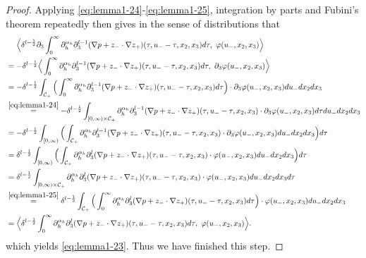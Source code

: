 \documentclass[10pt,reqno]{amsart}
\numberwithin{equation}{section}
\begin{document}
\begin{proof}
Applying \eqref{eq:lemma1-24}-\eqref{eq:lemma1-25}, integration by parts and Fubini's theorem repeatedly then gives in the sense of distributions that 
	\begin{align*}
		&\ \ \ \  \Big\langle\delta^{l-\frac{1}{2}} \partial_3\int_0^{\infty} \partial_h^{\alpha_h}\partial_3^{l-1}(\nabla p+z_{-}\cdot\nabla z_{+}) 
		(\tau,u_--\tau,x_2,x_3)d\tau,\ \varphi(u_-,x_2,x_3)\Big\rangle\\
		&=-\delta^{l-\frac{1}{2}}\Big\langle\int_0^{\infty}\partial_h^{\alpha_h}\partial_3^{l-1}(\nabla p+z_{-}\cdot\nabla z_{+}) 
		(\tau,u_--\tau,x_2,x_3)d\tau,\  \partial_3 \varphi(u_-,x_2,x_3)\Big\rangle\\
		&=-\delta^{l-\frac{1}{2}}\int_{\mathcal{C}_+}\Big(\int_0^{\infty}\partial_h^{\alpha_h}\partial_3^{l-1}(\nabla p+z_{-}\cdot\nabla z_{+}) 
		(\tau,u_--\tau,x_2,x_3)d\tau\Big)\cdot \partial_3\varphi(u_-,x_2,x_3)du_-dx_2dx_3\\
		&\stackrel{ 
			\eqref{eq:lemma1-24}}{=}-\delta^{l-\frac{1}{2}}\int_{[0,\infty) \times \mathcal{C}_+}\partial_h^{\alpha_h}\partial_3^{l-1}(\nabla p+z_{-}\cdot\nabla z_{+}) (\tau,u_--\tau,x_2,x_3)\cdot \partial_3\varphi(u_-,x_2,x_3)d\tau du_-dx_2dx_3\\
		&=-\delta^{l-\frac{1}{2}}\int_{[0,\infty)} \Big(\int_{\mathcal{C}_+}\partial_h^{\alpha_h}\partial_3^{l-1}(\nabla p+z_{-}\cdot\nabla z_{+}) (\tau,u_--\tau,x_2,x_3)\cdot \partial_3\varphi(u_-,x_2,x_3)du_-dx_2dx_3\Big)d\tau \\
		&=\delta^{l-\frac{1}{2}}\int_{[0,\infty)} \Big(\int_{\mathcal{C}_+}\partial_h^{\alpha_h}\partial_3^l(\nabla p+z_{-}\cdot\nabla z_{+}) (\tau,u_--\tau,x_2,x_3)\cdot \varphi(u_-,x_2,x_3)du_-dx_2dx_3\Big)d\tau \\
		&=\delta^{l-\frac{1}{2}}\int_{[0,\infty)\times \mathcal{C}_+}\partial_h^{\alpha_h}\partial_3^l(\nabla p+z_{-}\cdot\nabla z_{+}) (\tau,u_--\tau,x_2,x_3)\cdot \varphi(u_-,x_2,x_3)du_-dx_2dx_3d\tau\\
		&\stackrel{  
		\eqref{eq:lemma1-25}}{=}\delta^{l-\frac{1}{2}}\int_{\mathcal{C}_+}\Big(\int_{0}^{\infty} \partial_h^{\alpha_h}\partial_3^l(\nabla p+z_{-}\cdot\nabla z_{+})(\tau,u_--\tau,x_2,x_3)d\tau\Big)\cdot \varphi(u_-,x_2,x_3)du_-dx_2dx_3\\
		&=\Big\langle\delta^{l-\frac{1}{2}}\int_0^{\infty}  \partial_h^{\alpha_h}\partial_3^l(\nabla p+z_{-}\cdot\nabla z_{+})(\tau,u_--\tau,x_2,x_3)d\tau,\ \varphi(u_-,x_2,x_3)\Big\rangle.
	\end{align*}
which yields \eqref{eq:lemma1-23}. Thus we have finished this step. 
 

\end{proof}
\end{document}
